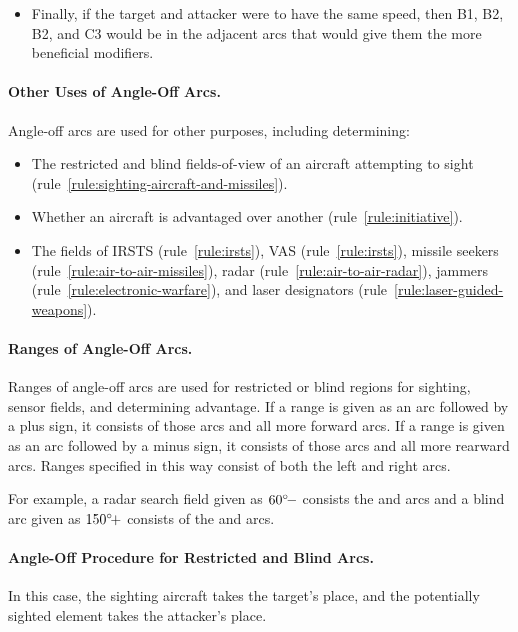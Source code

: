 {\begin{itemize}
\item
Finally, if the target and attacker were to have the same speed, then B1, B2, B2, and C3 would be in the adjacent arcs that would give them the more beneficial modifiers. 

\end{itemize}

\paragraph{Other Uses of Angle-Off Arcs.}
Angle-off arcs are used for other purposes, including determining:
\begin{itemize}
    \item The restricted and blind fields-of-view of an aircraft attempting to sight (rule~\ref{rule:sighting-aircraft-and-missiles}).
    \item Whether an aircraft is advantaged over another (rule~\ref{rule:initiative}).
    \item The fields of IRSTS (rule~\ref{rule:irsts}), VAS (rule~\ref{rule:irsts}), missile seekers (rule~\ref{rule:air-to-air-missiles}), radar (rule~\ref{rule:air-to-air-radar}), jammers (rule~\ref{rule:electronic-warfare}), and laser designators (rule~\ref{rule:laser-guided-weapons}).
\end{itemize}

\paragraph{Ranges of Angle-Off Arcs.} Ranges of angle-off arcs are used for restricted or blind regions for sighting, sensor fields, and determining advantage. If a range is given as an arc followed by a plus sign, it consists of those arcs and all more forward arcs. If a range is given as an arc followed by a minus sign, it consists of those arcs and all more rearward arcs. Ranges specified in this way consist of both the left and right arcs.

For example, a radar search field given as $\mbox{$60{^\circ}\!-$}$ consists the  and  arcs and a blind arc given as $\mbox{$150{^\circ}\!+$}$ consists of the  and  arcs. 

\paragraph{Angle-Off Procedure for Restricted and Blind Arcs.}
In this case, the sighting aircraft takes the target's place, and the potentially sighted element takes the attacker's place. 

}
